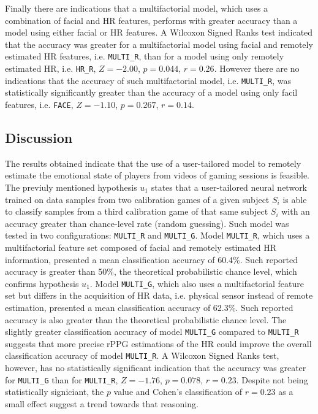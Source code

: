 Finally there are indications that a multifactorial model, which uses a combination of facial and HR features, performs with greater accuracy than a model using either facial or HR features. A Wilcoxon Signed Ranks test indicated that the accuracy was greater for a multifactorial model using facial and remotely estimated HR features, i.e. \texttt{MULTI\_R}, than for a model using only remotely estimated HR, i.e. \texttt{HR\_R}, $Z=-2.00$, $p=0.044$, $r=0.26$. However there are no indications that the accuracy of such multifactorial model, i.e. \texttt{MULTI\_R}, was statistically significantly greater than the accuracy of a model using only facil features, i.e. \texttt{FACE}, $Z=-1.10$, $p=0.267$, $r=0.14$.

\subsection{Discussion}



The results obtained indicate that the use of a user-tailored model to remotely estimate the emotional state of players from videos of gaming sessions is feasible. The previuly mentioned hypothesis $u_1$ states that a user-tailored neural network trained on data samples from two calibration games of a given subject $S_i$ is able to classify samples from a third calibration game of that same subject $S_i$ with an accuracy greater than chance-level rate (random guessing). Such model was tested in two configurations: \texttt{MULTI\_R} and \texttt{MULTI\_G}. Model \texttt{MULTI\_R}, which uses a multifactorial feature set composed of facial and remotely estimated HR information, presented a mean classification accuracy of 60.4\%. Such reported accuracy is greater than 50\%, the theoretical probabilistic chance level, which confirms hypothesis $u_1$. Model \texttt{MULTI\_G}, which also uses a multifactorial feature set but differs in the acquisition of HR data, i.e. physical sensor instead of remote estimation, presented a mean classification accuracy of 62.3\%. Such reported accuracy is also greater than the theoretical probabilistic chance level. The slightly greater classification accuracy of model \texttt{MULTI\_G} compared to \texttt{MULTI\_R} suggests that more precise rPPG estimations of the HR could improve the overall classification accuracy of model \texttt{MULTI\_R}. A Wilcoxon Signed Ranks test, however, has no statistically significant indication that the accuracy was greater for \texttt{MULTI\_G} than for \texttt{MULTI\_R}, $Z=-1.76$, $p=0.078$, $r=0.23$. Despite not being statistically signiciant, the $p$ value and Cohen's classification of $r=0.23$ as a small effect suggest a trend towards that reasoning.

